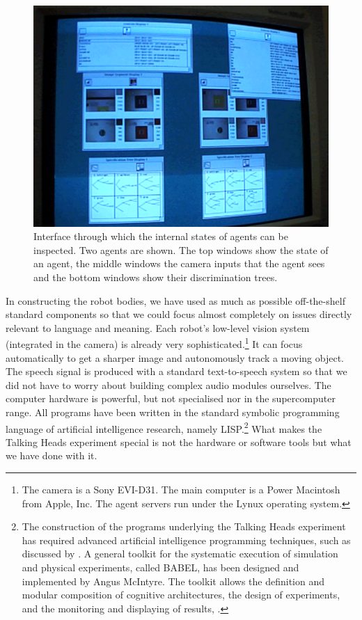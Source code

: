 \begin{figure}[htbp]
  \centerline{\includegraphics[width=.60\textwidth]{chap1/figs/interface.pdf}}
\caption{ Interface through which the internal states of agents can 
be inspected. Two agents are shown. The top windows show the state of an agent, 
the middle windows the camera inputs that the agent sees and the bottom windows show 
their discrimination trees.}
\label{f:agentview}
\end{figure}

In constructing the robot bodies, we have used as much as
possible off-the-shelf standard 
components so that we could focus almost completely on issues
directly relevant to language and meaning.
Each robot's low-level vision system
(integrated in the camera) is already very sophisticated.\footnote{
The camera is a Sony EVI-D31. The main computer is a Power 
Macintosh from Apple, Inc. The agent servers run under the 
Lynux operating system.}
It can focus automatically to get a sharper image
and autonomously track a moving object. The speech signal is 
produced with a standard text-to-speech system 
so that we did not have to 
worry about building complex audio modules ourselves.
The computer hardware 
is powerful, but not specialised nor in the supercomputer 
range. All programs have been written in the standard symbolic 
programming language of artificial intelligence 
research, namely LISP.\footnote{
The construction of the programs underlying the 
Talking Heads experiment has required advanced
artificial intelligence programming techniques, 
such as discussed by \cite{Norvig:1996}. A general
toolkit for the systematic execution of 
simulation and physical experiments, called BABEL, has been
designed and implemented by Angus McIntyre. The 
toolkit allows the definition and modular composition
of cognitive architectures, the design of 
experiments, and the monitoring and displaying of 
results, \cite{McIntyre:1998}.} What makes the Talking Heads experiment
special is not the hardware or software tools
but what we have done with it.

